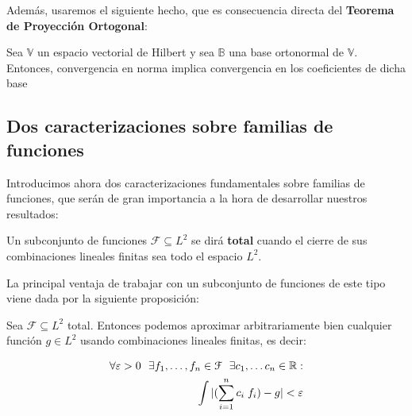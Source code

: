 Además, usaremos el siguiente hecho, que es consecuencia directa del \textbf{Teorema de Proyección Ortogonal}:

\begin{observacion}

	Sea $\mathbb{V}$ un espacio vectorial de Hilbert y sea $\mathbb{B}$ una base ortonormal de $\mathbb{V}$. Entonces, convergencia en norma implica convergencia en los coeficientes de dicha base

\end{observacion}


\subsection{Dos caracterizaciones sobre familias de funciones} \label{subs:caracterizaciones_familias_funciones}


Introducimos ahora dos caracterizaciones fundamentales sobre familias de funciones, que serán de gran importancia a la hora de desarrollar nuestros resultados:

\begin{definicion}
	Un subconjunto de funciones $\mathcal{F} \subseteq L^2$ se dirá \textbf{total} cuando el cierre de sus combinaciones lineales finitas sea todo el espacio $L^2$.
\end{definicion}

La principal ventaja de trabajar con un subconjunto de funciones de este tipo viene dada por la siguiente proposición:

\begin{proposicion} \label{prop:conjuntos_totales_epsilon_aproximacion}
	Sea $\mathcal{F} \subseteq L^2$ total. Entonces podemos aproximar arbitrariamente bien cualquier función $g \in L^2$ usando combinaciones lineales finitas, es decir:

	\begin{equation} \label{eq:conjuntos_totales_epsilon_aproximacion}
		\begin{split}
			\forall \varepsilon > 0 \ \  \exists f_1, \ldots, f_n \in \mathcal{F} \ \  \exists c_1, \ldots c_n \in \mathbb{R}:\\
			\int | (\sum_{i = 1}^n c_i \; f_i) - g| < \varepsilon \\
		\end{split}
	\end{equation}

\end{proposicion}

